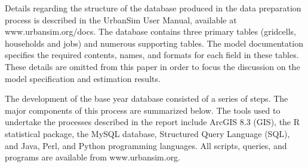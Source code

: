 Details regarding the structure of  the database produced in the
data preparation process is described in the UrbanSim User Manual,
available at www.urbansim.org/docs. The database contains three
primary tables (gridcells, households and jobs) and numerous
supporting tables. The model documentation specifies the required
contents, names, and formats for each field in these tables. These
details are omitted from this paper in order to focus the
discussion on the model specification and estimation results.

The development of the base year database consisted of a series of
steps.  The major components of this process are summarized below.
The tools used to undertake the processes described in the report
include ArcGIS 8.3 (GIS), the R statistical package, the MySQL
database, Structured Query Language (SQL), and Java, Perl, and
Python programming languages. All scripts, queries, and programs
are available from www.urbansim.org.

